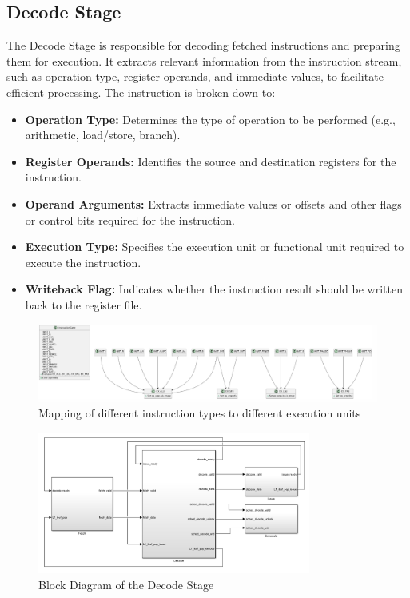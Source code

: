 \documentclass[12pt]{report}
\begin{document}
\subsection{Decode Stage}
The Decode Stage is responsible for decoding fetched instructions and preparing them for execution. It extracts relevant information from the instruction stream, such as operation type, register operands, and immediate values, to facilitate efficient processing. The instruction is broken down to:
\begin{itemize}
    \item \textbf{Operation Type:} Determines the type of operation to be performed (e.g., arithmetic, load/store, branch).
    \item \textbf{Register Operands:} Identifies the source and destination registers for the instruction.
    \item \textbf{Operand Arguments:} Extracts immediate values or offsets and other flags or control bits required for the instruction.
    \item \textbf{Execution Type:} Specifies the execution unit or functional unit required to execute the instruction.
    \item \textbf{Writeback Flag:} Indicates whether the instruction result should be written back to the register file.
\end{itemize}
\begin{figure}[H]
    \centering
    \includegraphics[width=1\textwidth]{./figures/decode2.png}
    \caption{Mapping of different instruction types to different execution units}
\end{figure}

\begin{figure}[H]
    \centering
    \includegraphics[width=0.8\textwidth]{./figures/decode.png}
    \caption{Block Diagram of the Decode Stage}
\end{figure}
\end{document}
